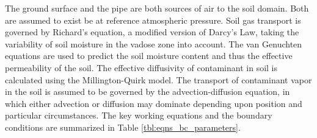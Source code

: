 \documentclass[journal=esthag,manuscript=article]{achemso}
\begin{document}
The ground surface and the pipe are both sources of air to the soil domain.
Both are assumed to exist be at reference atmospheric pressure.
Soil gas transport is governed by Richard’s equation, a modified version of Darcy’s Law, taking the variability of soil moisture in the vadose zone into account\cite{richards_capillary_1931}.
The van Genuchten equations are used to predict the soil moisture content and thus the effective permeability of the soil\cite{van_genuchten_closed-form_1980}.
The effective diffusivity of contaminant in soil is calculated using the Millington-Quirk model\cite{millington_permeability_1961}.
The transport of contaminant vapor in the soil is assumed to be governed by the advection-diffusion equation, in which either advection or diffusion may dominate depending upon position and particular circumstances.
The key working equations and the boundary conditions are summarized in Table \ref{tbl:eqns_bc_parameters}.\par
\end{document}
